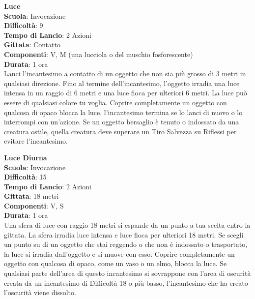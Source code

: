 \begin{multicols}{2}
\medskip\textbf{Luce}\\
\textbf{Scuola}: Invocazione\\
\textbf{Difficoltà}:  9\\
\textbf{Tempo di Lancio}: 2 Azioni\\
\textbf{Gittata}: Contatto\\
\textbf{Componenti}: V, M (una lucciola o del muschio fosforescente)\\
\textbf{Durata}: 1 ora\\
Lanci l'incantesimo a contatto di un oggetto che non sia più grosso di 3 metri in qualsiasi direzione. Fino al termine dell'incantesimo, l’oggetto irradia una luce intensa in un raggio di 6 metri e una luce fioca per ulteriori 6 metri. La luce può essere di qualsiasi colore tu voglia. Coprire completamente un oggetto con qualcosa di opaco blocca la luce. l'incantesimo termina se lo lanci di nuovo o lo interrompi con un'azione. Se un oggetto bersaglio è tenuto o indossato da una creatura ostile, quella creatura deve superare un Tiro Salvezza su Riflessi per evitare l'incantesimo. 

\medskip\textbf{Luce Diurna}\\
\textbf{Scuola}: Invocazione\\
\textbf{Difficoltà}:  15\\
\textbf{Tempo di Lancio}: 2 Azioni\\
\textbf{Gittata}: 18 metri\\
\textbf{Componenti}: V, S\\
\textbf{Durata}: 1 ora\\
Una sfera di luce con raggio 18 metri si espande da un punto a tua scelta entro la gittata. La sfera irradia luce intensa e luce fioca per ulteriori 18 metri. Se scegli un punto su di un oggetto che stai reggendo o che non è indossato o trasportato, la luce si irradia dall'oggetto e si muove con esso. Coprire completamente un oggetto con qualcosa di opaco, come un vaso o un elmo, blocca la luce. Se qualsiasi parte dell'area di questo incantesimo si sovrappone con l’area di oscurità creata da un incantesimo di Difficoltà 18 o più basso, l'incantesimo che ha creato l’oscurità viene dissolto.


\end{multicols}
